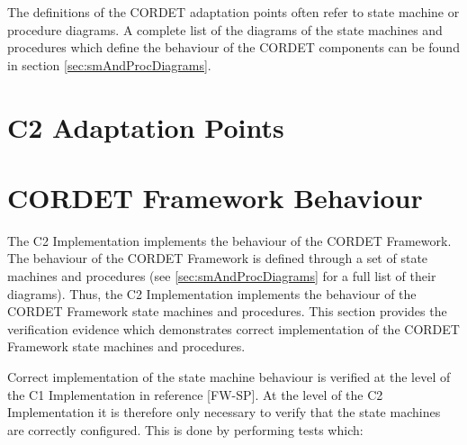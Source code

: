 \documentclass{pnp_article}
\begin{document}
The definitions of the CORDET adaptation points often refer to state machine or procedure diagrams. A complete list of the diagrams of the state machines and procedures which define the behaviour of the CORDET components can be found in section \ref{sec:smAndProcDiagrams}.


\begin{landscape}


\end{landscape}



\section{C2 Adaptation Points}\label{sec:implC2Ap}




\section{CORDET Framework Behaviour}\label{sec:verCrFwBehaviour}
The C2 Implementation implements the behaviour of the CORDET Framework. The behaviour of the CORDET Framework is defined through a set of state machines and procedures (see  \ref{sec:smAndProcDiagrams} for a full list of their diagrams). Thus, the C2 Implementation implements the behaviour of the CORDET Framework state machines and procedures. This section provides the verification evidence which demonstrates correct implementation of the CORDET Framework state machines and procedures.  


Correct implementation of the state machine behaviour is verified at the level of the C1 Implementation in reference [FW-SP]. At the level of the C2 Implementation it is therefore only necessary to verify that the state machines are correctly configured. This is done by performing tests which:
\end{document}

